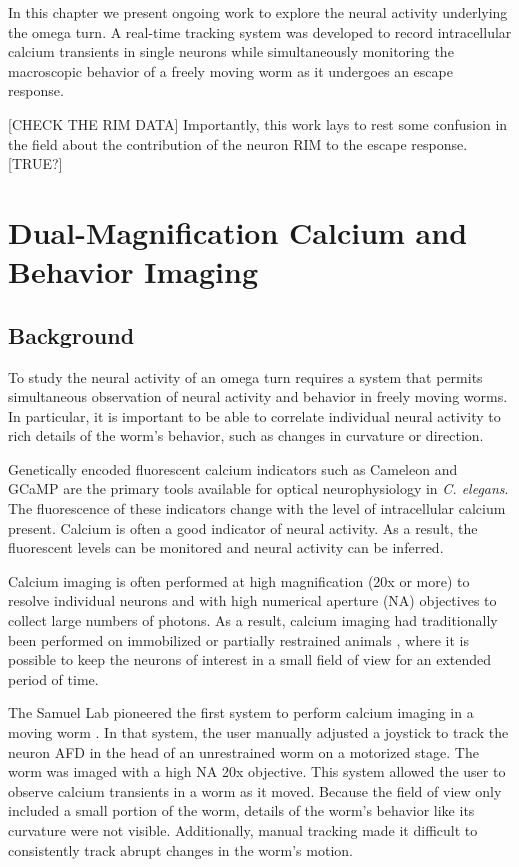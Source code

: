 In this chapter we present ongoing work to explore the neural activity underlying the omega turn. A real-time tracking system was developed to record intracellular calcium transients in single neurons while simultaneously monitoring the macroscopic behavior of a freely moving worm as it undergoes an escape response.

[CHECK THE RIM DATA] Importantly, this work lays to rest some confusion in the field about the contribution of the neuron RIM to the escape response.  [TRUE?]

 
\section{Dual-Magnification Calcium and Behavior Imaging}
\subsection{Background}
To study the neural activity of an omega turn requires a system that permits simultaneous observation of neural activity and behavior in freely moving worms.  In particular, it is important to be able to correlate individual neural activity to rich details of the worm's behavior, such as changes in curvature or direction.


Genetically encoded fluorescent calcium indicators such as Cameleon \citep{miyawaki_fluorescent_1997} and GCaMP \citep{tian_imaging_2009} are the primary tools available for optical neurophysiology in \textit{C. elegans}.  The fluorescence of these indicators change with the level of intracellular calcium present. Calcium is often a good indicator of neural activity. As a result, the fluorescent levels can be monitored and neural activity can be inferred.

Calcium imaging is often performed at high magnification (20x or more)  to resolve individual neurons and with high numerical aperture (NA) objectives to collect large numbers of photons. As a result, calcium imaging had traditionally been  performed on immobilized  \citep{clark_afd_2006} or partially restrained animals  \citep{faumont_awake_2006}, where it is possible to keep the neurons of interest in a small field of view for an extended period of time. 

The Samuel Lab pioneered the first system to perform calcium imaging in a moving worm \citep{clark_temporal_2007}. In that system, the user manually adjusted a joystick to track the neuron AFD in the head of an unrestrained worm on a motorized stage. The worm was imaged with a high NA 20x objective. This system allowed the user to observe calcium transients in a worm as it moved. Because the field of view only included a small portion of the worm,  details of the worm's behavior like its curvature were not visible.  Additionally, manual tracking made it difficult to consistently track abrupt changes in the worm's  motion.

